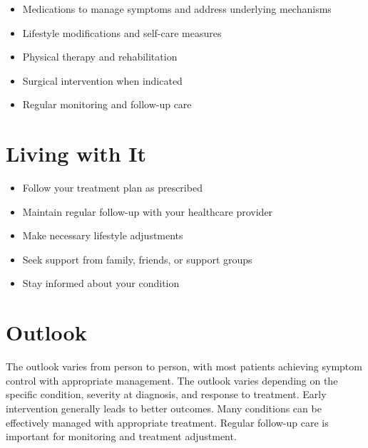 \begin{itemize}[noitemsep]
  \item Medications to manage symptoms and address underlying mechanisms
  \item Lifestyle modifications and self-care measures
  \item Physical therapy and rehabilitation
  \item Surgical intervention when indicated
  \item Regular monitoring and follow-up care
\end{itemize}
\section{Living with It}
\begin{itemize}[noitemsep]
  \item Follow your treatment plan as prescribed
  \item Maintain regular follow-up with your healthcare provider
  \item Make necessary lifestyle adjustments
  \item Seek support from family, friends, or support groups
  \item Stay informed about your condition
\end{itemize}
\section{Outlook}
The outlook varies from person to person, with most patients achieving symptom control with appropriate management. The outlook varies depending on the specific condition, severity at diagnosis, and response to treatment. Early intervention generally leads to better outcomes. Many conditions can be effectively managed with appropriate treatment. Regular follow-up care is important for monitoring and treatment adjustment.
